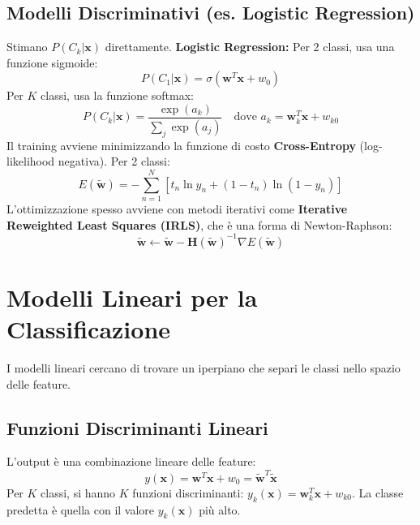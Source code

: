 \documentclass[a4paper,11pt]{article}
\begin{document}
\subsection{Modelli Discriminativi (es. Logistic Regression)}
Stimano $P(C_k|\mathbf{x})$ direttamente.
\noindent\textbf{Logistic Regression:} Per 2 classi, usa una funzione sigmoide:
\begin{equation}
    P(C_1|\mathbf{x}) = \sigma(\mathbf{w}^T \mathbf{x} + w_0)
\end{equation}
Per $K$ classi, usa la funzione softmax:
\begin{equation}
    P(C_k | \mathbf{x}) = \frac{\exp(a_k)}{\sum_j \exp(a_j)} \quad \text{dove } a_k = \mathbf{w}_k^T \mathbf{x} + w_{k0}
\end{equation}
Il training avviene minimizzando la funzione di costo \textbf{Cross-Entropy} (log-likelihood negativa). Per 2 classi:
\begin{equation}
    E(\tilde{\mathbf{w}}) = - \sum_{n=1}^N[t_n \ln y_n + (1 - t_n) \ln(1 - y_n)]
\end{equation}
L'ottimizzazione spesso avviene con metodi iterativi come \textbf{Iterative Reweighted Least Squares (IRLS)}, che è una forma di Newton-Raphson:
\begin{equation}
    \tilde{\mathbf{w}} \leftarrow \tilde{\mathbf{w}} - \mathbf{H}(\tilde{\mathbf{w}})^{-1} \nabla E(\tilde{\mathbf{w}})
\end{equation}

\section{Modelli Lineari per la Classificazione}

I modelli lineari cercano di trovare un iperpiano che separi le classi nello spazio delle feature.

\subsection{Funzioni Discriminanti Lineari}
L'output è una combinazione lineare delle feature:
\begin{equation}
    y(\mathbf{x}) = \mathbf{w}^T \mathbf{x} + w_0 = \tilde{\mathbf{w}}^T \tilde{\mathbf{x}}
\end{equation}
Per $K$ classi, si hanno $K$ funzioni discriminanti: $y_k(\mathbf{x}) = \mathbf{w}_k^T \mathbf{x} + w_{k0}$. La classe predetta è quella con il valore $y_k(\mathbf{x})$ più alto.
\end{document}
